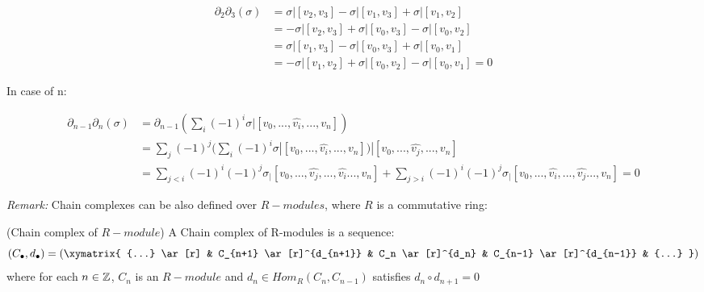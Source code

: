 \documentclass[11pt,a4paper]{report}
\begin{document}
          
            \begin{equation}
                \begin{aligned}
                    \partial_2 \partial_3(\sigma) &= \sigma | [v_2, v_3] - \sigma | [v_1, v_3] + \sigma | [v_1, v_2] \\
                    &= -\sigma | [v_2, v_3] + \sigma | [v_0, v_3] - \sigma | [v_0, v_2] \\
                    &= \sigma | [v_1, v_3] - \sigma | [v_0, v_3] + \sigma | [v_0, v_1] \\
                    &= -\sigma | [v_1, v_2] + \sigma | [v_0, v_2] - \sigma | [v_0, v_1] = 0 
                \end{aligned}
            \end{equation}
            
        In case of n:
        
            \begin{equation}
                \begin{aligned}
                    \partial_{n-1} \partial_n(\sigma) &=  \partial_{n-1}(\sum\limits_i (-1)^i \sigma | [v_0, ... ,\hat{v_i}, ... , v_n]) \\
                    &=  \sum\limits_j (-1)^j ( \sum\limits_i (-1)^i \sigma | [v_0, ... ,\hat{v_i}, ... , v_n]) | [v_0, ... ,\hat{v_j}, ... , v_n] \\
                    &=  \sum\limits_{j<i} (-1)^i(-1)^j  \sigma_ | [v_0, ... ,\hat{v_j},... ,\hat{v_i} ... , v_n] +
                    \sum\limits_{j>i} (-1)^i(-1)^{j}  \sigma_ | [v_0, ... ,\hat{v_i},... ,\hat{v_j} ... , v_n] = 0
                \end{aligned}
            \end{equation}
		 
        \emph{Remark: } Chain complexes can be also defined over $R-modules$, where $R$ is a commutative ring: 
        
        \begin{defn} (Chain complex of $R-module$)
        A Chain complex of R-modules is a sequence: 
                \[ (C_\bullet, d_\bullet)= (
                        \xymatrix{
                            {...}  \ar[r] & 
                            C_{n+1}  \ar[r]^{d_{n+1}} & 
                            C_n  \ar[r]^{d_n} & 
                            C_{n-1}  \ar[r]^{d_{n-1}} & 
                            {...} 
                             } )
                   \]
        where for each $n \in \mathbb{Z}$, $C_n$ is an $R-module$ and $d_n \in Hom_{R}(C_n, C_{n-1})$ satisfies
        $d_n \circ d_{n+1} = 0$
        \end{defn}
        
\end{document}

